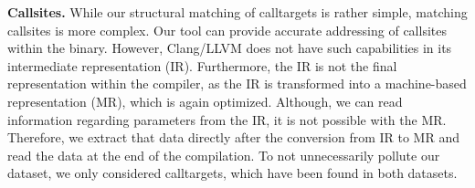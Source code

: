 \textbf{Callsites.} While our structural matching of calltargets is rather simple, matching callsites is more complex. Our tool can provide accurate addressing of 
callsites within the binary. However, Clang/LLVM does not have such capabilities in its intermediate representation (IR). Furthermore, the IR is not the final representation within
the compiler, as the IR is transformed into a machine-based representation (MR), which is again optimized. Although, we can read information regarding parameters from the IR, it 
is not possible with the MR. Therefore, we extract that data directly after the conversion from IR to MR and read the data at the end of the compilation. To not unnecessarily 
pollute our dataset, we only considered calltargets, which have been found in both datasets. 


